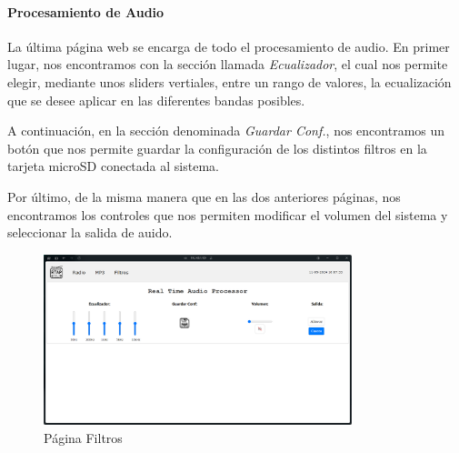 \paragraph{Procesamiento de Audio}

La última página web se encarga de todo el procesamiento de audio. En primer lugar, nos encontramos con la sección llamada \textit{Ecualizador}, el cual nos permite elegir, mediante unos sliders vertiales, entre un rango de valores, la ecualización que se desee aplicar en las diferentes bandas posibles.

A continuación, en la sección denominada \textit{Guardar Conf.}, nos encontramos un botón que nos permite guardar la configuración de los distintos filtros en la tarjeta microSD conectada al sistema.

Por último, de la misma manera que en las dos anteriores páginas, nos encontramos los controles que nos permiten modificar el volumen del sistema y seleccionar la salida de auido.

\begin{figure}[h]
    \centering
    \includegraphics[width=0.8\textwidth]{images/3/3-1/3-1-1-4/Pagina_Filtros.png}
    \caption{Página Filtros}
    \label{fig:3-1-1-4-Filtros}
\end{figure}